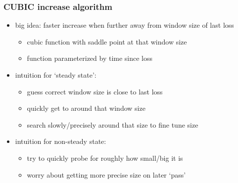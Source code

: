 \begin{frame}
    \frametitle{CUBIC increase algorithm}
    \begin{itemize}
    \item big idea: faster increase when further away from window size of last loss
        \begin{itemize}
        \item cubic function with saddle point at that window size
        \item function parameterized by time since loss
        \end{itemize}
    \item intuition for `steady state':
        \begin{itemize}
        \item guess correct window size is close to last loss
        \item quickly get to around that window size
        \item search slowly/precisely around that size to fine tune size
        \end{itemize}
    \item intuition for non-steady state:
        \begin{itemize}
        \item try to quickly probe for roughly how small/big it is
        \item worry about getting more precise size on later `pass'
        \end{itemize}
    \end{itemize}
\end{frame}


